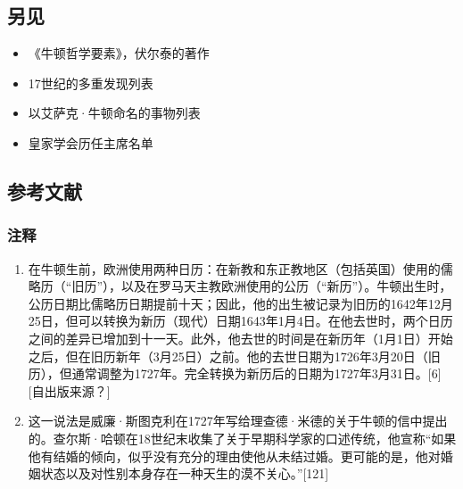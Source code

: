 \subsection{另见}
\begin{itemize}
\item 《牛顿哲学要素》，伏尔泰的著作  
\item 17世纪的多重发现列表  
\item 以艾萨克·牛顿命名的事物列表  
\item 皇家学会历任主席名单
\end{itemize}
\subsection{参考文献}  
\subsubsection{注释}
\begin{enumerate}
\item 在牛顿生前，欧洲使用两种日历：在新教和东正教地区（包括英国）使用的儒略历（“旧历”），以及在罗马天主教欧洲使用的公历（“新历”）。牛顿出生时，公历日期比儒略历日期提前十天；因此，他的出生被记录为旧历的1642年12月25日，但可以转换为新历（现代）日期1643年1月4日。在他去世时，两个日历之间的差异已增加到十一天。此外，他去世的时间是在新历年（1月1日）开始之后，但在旧历新年（3月25日）之前。他的去世日期为1726年3月20日（旧历），但通常调整为1727年。完全转换为新历后的日期为1727年3月31日。[6][自出版来源？]  
\item 这一说法是威廉·斯图克利在1727年写给理查德·米德的关于牛顿的信中提出的。查尔斯·哈顿在18世纪末收集了关于早期科学家的口述传统，他宣称“如果他有结婚的倾向，似乎没有充分的理由使他从未结过婚。更可能的是，他对婚姻状态以及对性别本身存在一种天生的漠不关心。”[121]
\end{enumerate}  

